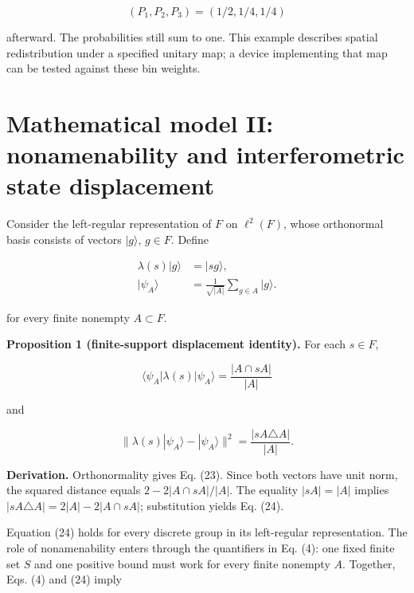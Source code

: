 \documentclass[11pt,a4paper]{article}
\begin{document}
\begin{equation}\label{eq:21}
\boxed{(P_1,P_2,P_3)=(1/2,1/4,1/4)}
\end{equation}

afterward. The probabilities still sum to one. This example describes spatial redistribution under a specified unitary map; a device implementing that map can be tested against these bin weights.

\hypertarget{mathematical-model-ii-nonamenability-and-interferometric-state-displacement}{%
\section{Mathematical model II: nonamenability and interferometric state displacement}\label{mathematical-model-ii-nonamenability-and-interferometric-state-displacement}}

Consider the left-regular representation of \(F\) on \(\ell^2(F)\), whose orthonormal basis consists of vectors \(|g\rangle\), \(g\in F\). Define

\begin{equation}\label{eq:22}
\begin{aligned}
\lambda(s)|g\rangle&=|sg\rangle,\\
|\psi_A\rangle&=\frac{1}{\sqrt{|A|}}\sum_{g\in A}|g\rangle.
\end{aligned}
\end{equation}

for every finite nonempty \(A\subset F\).

\textbf{Proposition 1 (finite-support displacement identity).} For each \(s\in F\),

\begin{equation}\label{eq:23}
\langle\psi_A|\lambda(s)|\psi_A\rangle
=\frac{|A\cap sA|}{|A|}
\end{equation}

and

\begin{equation}\label{eq:24}
\boxed{\|\lambda(s)|\psi_A\rangle-|\psi_A\rangle\|^2
=\frac{|sA\triangle A|}{|A|}}.
\end{equation}

\textbf{Derivation.} Orthonormality gives Eq. (23). Since both vectors have unit norm, the squared distance equals \(2-2|A\cap sA|/|A|\). The equality \(|sA|=|A|\) implies \(|sA\triangle A|=2|A|-2|A\cap sA|\); substitution yields Eq. (24).

Equation (24) holds for every discrete group in its left-regular representation. The role of nonamenability enters through the quantifiers in Eq. (4): one fixed finite set \(S\) and one positive bound must work for every finite nonempty \(A\). Together, Eqs. (4) and (24) imply
\end{document}
